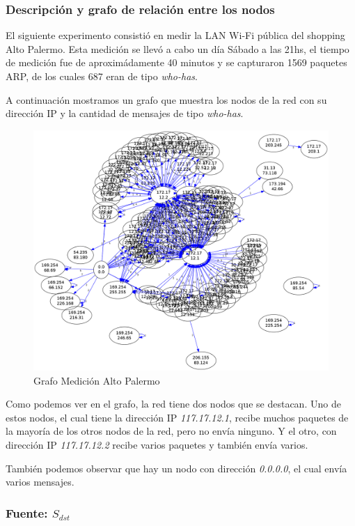 \subsubsection{Descripción y grafo de relación entre los nodos}

El siguiente experimento consistió en medir la LAN Wi-Fi pública del shopping Alto Palermo. Esta medición se llevó a cabo un día Sábado a las 21hs, el tiempo de medición fue de aproximádamente 40 minutos y se capturaron 1569 paquetes ARP, de los cuales 687 eran de tipo \emph{who-has}.

A continuación mostramos un grafo que muestra los nodos de la red con su dirección IP y la cantidad de mensajes de tipo \emph{who-has}.

\begin{figure}[H]
 \begin{center}
  \includegraphics[width=0.9\linewidth]{../imgs/red-alto-palermo_red.png}
  \caption{Grafo Medición Alto Palermo}
 \end{center}
\end{figure}

Como podemos ver en el grafo, la red tiene dos nodos que se destacan. Uno de estos nodos, el cual tiene la dirección IP \emph{117.17.12.1}, recibe muchos paquetes de la mayoría de los otros nodos de la red, pero no envía ninguno. Y el otro, con dirección IP \emph{117.17.12.2} recibe varios paquetes y también envía varios.

También podemos observar que hay un nodo con dirección \emph{0.0.0.0}, el cual envía varios mensajes. %

\subsubsection{Fuente: $S_{dst}$}

